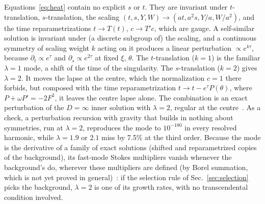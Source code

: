 \documentclass[aps,prd,onecolumn,superscriptaddress,nofootinbib,10pt]{revtex4-2}
\begin{document}
Equations~\eqref{eq:heat} contain no explicit $s$ or $t$. They are invariant under $t$-translation, $s$-translation, the
scaling $(t, s, Y, W) \to (at, a^2s, Y/a, W/a^2)$, and the time reparametrizations $t \to T(t)$, $c \to T'c$, which are
gauge. A self-similar solution is invariant under (a discrete subgroup of) the scaling, and a continuous symmetry of
scaling weight $k$ acting on it produces a linear perturbation $\propto e^{k\tau}$, because $\partial_t \propto e^{\tau}$
and $\partial_s \propto e^{2\tau}$ at fixed $\xi$, $\theta$. The $t$-translation ($k = 1$) is the familiar $\lambda = 1$
mode, a shift of the time of the singularity. The $s$-translation ($k = 2$) gives $\lambda = 2$. It moves the lapse at the
centre, which the normalization $c = 1$ there forbids, but composed with the time reparametrization
$t \to t - e^{\tau}P(\theta)$, where $P + \omega P' = -2F^2$, it leaves the centre lapse alone. The combination is an exact
perturbation of the $D = \infty$ inner solution with $\lambda = 2$, regular at the centre~\cite[Prop.~5(ii)]{math}. As a
check, a
perturbation recursion with gravity that builds in nothing about symmetries, run at $\lambda = 2$, reproduces the mode to
$10^{-180}$ in every resolved harmonic, while $\lambda = 1.9$ or $2.1$ miss by 7.5\% at the third order. Because the mode
is the derivative of a family of exact solutions (shifted and reparametrized copies of the background), its fast-mode
Stokes multipliers vanish whenever the background's do, wherever these multipliers are defined (by Borel summation, which
is not yet proved in general)~\cite[Prop.~5(iii)]{math}: if the selection rule of Sec.~\ref{sec:selection} picks the
background, $\lambda = 2$ is one of its growth rates, with no transcendental condition involved.
\end{document}
